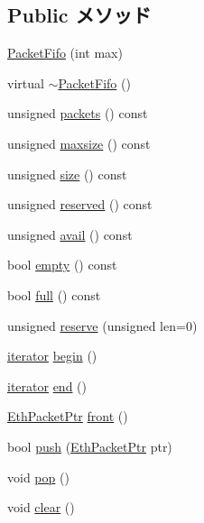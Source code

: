 \subsection*{Public メソッド}
\begin{DoxyCompactItemize}
\item 
\hyperlink{classPacketFifo_acc9c336039cbb7b6c68e558cebe2dc57}{PacketFifo} (int max)
\item 
virtual \hyperlink{classPacketFifo_a8885fbad8b4450af73ebe2daf366dca6}{$\sim$PacketFifo} ()
\item 
unsigned \hyperlink{classPacketFifo_a4c2cf4d8a6e10ea9a6a75a9a47044905}{packets} () const 
\item 
unsigned \hyperlink{classPacketFifo_ac62d045925522fd0bcc4261a036b79bc}{maxsize} () const 
\item 
unsigned \hyperlink{classPacketFifo_acdb549c592f948a9d973d4d84b02ef87}{size} () const 
\item 
unsigned \hyperlink{classPacketFifo_ae64dcd86c20aa54fcacb3f25d7b66b9a}{reserved} () const 
\item 
unsigned \hyperlink{classPacketFifo_aaf2f31de7b8cd9bf2085049b07125b1e}{avail} () const 
\item 
bool \hyperlink{classPacketFifo_ac6e61de369e994009e36f344f99c15ad}{empty} () const 
\item 
bool \hyperlink{classPacketFifo_aa0b75676033302511679a2f5e9638c4d}{full} () const 
\item 
unsigned \hyperlink{classPacketFifo_a67916a8cd004cf1b079dd2aa310f3647}{reserve} (unsigned len=0)
\item 
\hyperlink{classPacketFifo_a6905b6d8863a2eecd86b633802b68fda}{iterator} \hyperlink{classPacketFifo_ad69bd11391be1a1dba5c8202259664f8}{begin} ()
\item 
\hyperlink{classPacketFifo_a6905b6d8863a2eecd86b633802b68fda}{iterator} \hyperlink{classPacketFifo_acad38d52497a975bfb6f2f6acd76631f}{end} ()
\item 
\hyperlink{classRefCountingPtr}{EthPacketPtr} \hyperlink{classPacketFifo_a12006410db3b841b4764c57a9546d246}{front} ()
\item 
bool \hyperlink{classPacketFifo_ac4382beafcf27ce14f59707bc7f4c3d7}{push} (\hyperlink{classRefCountingPtr}{EthPacketPtr} ptr)
\item 
void \hyperlink{classPacketFifo_a312e7f6c761a199c1369fbe651e084f0}{pop} ()
\item 
void \hyperlink{classPacketFifo_ac8bb3912a3ce86b15842e79d0b421204}{clear} ()
\item 

\end{DoxyCompactItemize}
